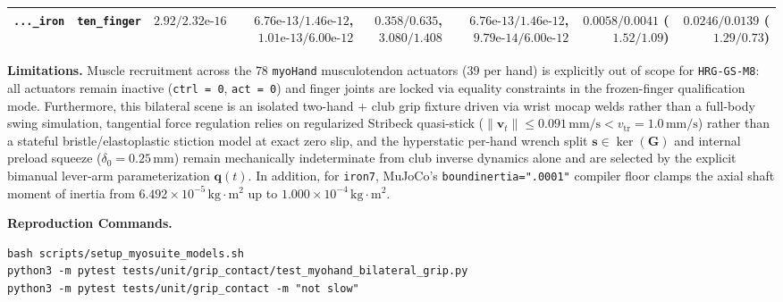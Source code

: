 \documentclass[11pt,a4paper]{article}
\begin{document}
\begin{table}[h!]
\begin{tabular}{llrrrrrr}
\texttt{...\_iron} & \texttt{ten\_finger} & $2.92 / 2.32\text{e-}16$ & $6.76\text{e-}13/1.46\text{e-}12$, $1.01\text{e-}13/6.00\text{e-}12$ & $0.358/0.635$, $3.080/1.408$ & $6.76\text{e-}13/1.46\text{e-}12$, $9.79\text{e-}14/6.00\text{e-}12$ & $0.0058/0.0041$ ($1.52/1.09$) & $0.0246/0.0139$ ($1.29/0.73$) \\
\bottomrule
\end{tabular}
\end{table}

\textbf{Limitations.}
Muscle recruitment across the $78$ \texttt{myoHand} musculotendon actuators ($39$ per hand) is explicitly out of scope for \texttt{HRG-GS-M8}: all actuators remain inactive (\texttt{ctrl = 0}, \texttt{act = 0}) and finger joints are locked via equality constraints in the frozen-finger qualification mode. Furthermore, this bilateral scene is an isolated two-hand + club grip fixture driven via wrist mocap welds rather than a full-body swing simulation, tangential force regulation relies on regularized Stribeck quasi-stick ($\|\mathbf{v}_t\| \le 0.091\,\mathrm{mm/s} < v_{\mathrm{tr}} = 1.0\,\mathrm{mm/s}$) rather than a stateful bristle/elastoplastic stiction model at exact zero slip, and the hyperstatic per-hand wrench split $\mathbf{s} \in \ker(\mathbf{G})$ and internal preload squeeze ($\delta_0 = 0.25\,\mathrm{mm}$) remain mechanically indeterminate from club inverse dynamics alone and are selected by the explicit bimanual lever-arm parameterization $\mathbf{q}(t)$. In addition, for \texttt{iron7}, MuJoCo's \texttt{boundinertia=".0001"} compiler floor clamps the axial shaft moment of inertia from $6.492 \times 10^{-5}\,\mathrm{kg\cdot m^2}$ up to $1.000 \times 10^{-4}\,\mathrm{kg\cdot m^2}$.

\textbf{Reproduction Commands.}
\begin{verbatim}
bash scripts/setup_myosuite_models.sh
python3 -m pytest tests/unit/grip_contact/test_myohand_bilateral_grip.py
python3 -m pytest tests/unit/grip_contact -m "not slow"
\end{verbatim}
\end{document}
